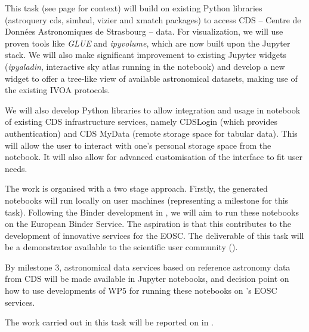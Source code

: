 \begin{task}[
  title=Demonstrator: Astronomy,
  id=astro,
  lead=CDS,
  PM=18,
  wphases={18-42},
  partners={EGI,INSERM,QS,SRL,WTT,XFEL}
]

  This task (see page \pageref{sec:concept-demonstrator-astronomy} for
  context) will build on existing Python libraries (astroquery cds, simbad, 
  vizier and xmatch packages) to access CDS -- Centre de Donn\'ees 
  Astronomiques de Strasbourg -- data.
  For visualization, we will
  use proven tools like \textit{GLUE} and \textit{ipyvolume}, which are now
  built upon the Jupyter stack.
  We will also make significant improvement to existing Jupyter widgets
  (\textit{ipyaladin}, interactive sky atlas running in the notebook) and
  develop a new widget to offer a tree-like view of available
    astronomical datasets, making use of the existing IVOA \cite{ivoa} protocols.

  We will also develop Python libraries to allow integration and usage in
  notebook of existing CDS infrastructure services, namely CDSLogin (which
  provides authentication) and CDS MyData (remote storage space for tabular
  data).
  This will allow the user to interact with one's personal storage space from
  the notebook. It will also allow for advanced customisation of the interface
  to fit user needs.

  The work is organised with a two stage approach. Firstly, the generated
  notebooks will run locally on user machines (representing a milestone for
  this task). Following the Binder development in , we will aim
  to run these notebooks on the European Binder Service. The aspiration is
  that this contributes to the development of innovative services for the EOSC.
  The deliverable of this task will be a demonstrator available to the
  scientific user community ().

  By milestone 3, astronomical data services based on reference
  astronomy data from CDS will be made available in Jupyter notebooks, and
  decision point on how to use developments of WP5 for running these
  notebooks on \TheProject's EOSC services.

  The work carried out in this task will be reported on in
  .
\end{task}
